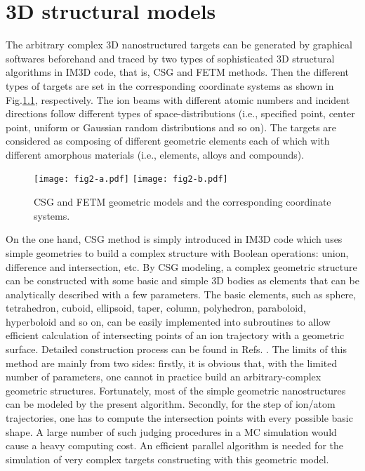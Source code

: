 
\chapter{3D structural models} %

\label{AppendixB} %


The arbitrary complex 3D nanostructured targets can be generated by graphical softwares beforehand and traced by two types of sophisticated 3D structural algorithms in IM3D code, that is, CSG and FETM methods\cite{Li2:2011,Li:2013}. Then the different types of targets are set in the corresponding coordinate systems as shown in Fig.\ref{Fig.2}, respectively. The ion beams with different atomic numbers and incident directions follow different types of space-distributions (i.e., specified point, center point, uniform or Gaussian random distributions and so on). The targets are considered as composing of different geometric elements each of which with different amorphous materials (i.e., elements, alloys and compounds).

\begin{figure}[!ht]\centering
\texttt{[image: fig2-a.pdf]}
\texttt{[image: fig2-b.pdf]}
\caption{CSG and FETM geometric models and the corresponding coordinate systems.} \label{Fig.2}
\end{figure}

On the one hand, CSG method\cite{Li:2005,Li:2009} is simply introduced in IM3D code which uses simple geometries to build a complex structure with Boolean operations: union, difference and intersection, etc. By CSG modeling, a complex geometric structure can be constructed with some basic and simple 3D bodies as elements that can be analytically described with a few parameters. The basic elements, such as sphere, tetrahedron, cuboid, ellipsoid, taper, column, polyhedron, paraboloid, hyperboloid and so on, can be easily implemented into subroutines to allow efficient calculation of intersecting points of an ion trajectory with a geometric surface. Detailed construction process can be found in Refs.\cite{Li:2005,Li:2009} . The limits of this method are mainly from two sides: firstly, it is obvious that, with the limited number of parameters, one cannot in practice build an arbitrary-complex geometric structures. Fortunately, most of the simple geometric nanostructures can be modeled by the present algorithm. Secondly, for the step of ion/atom trajectories, one has to compute the intersection points with every possible basic shape. A large number of such judging procedures in a MC simulation would cause a heavy computing cost. An efficient parallel algorithm is needed for the simulation of very complex targets constructing with this geometric model.

